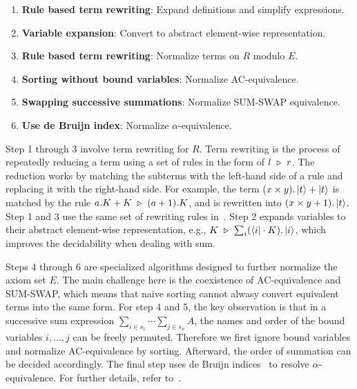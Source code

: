 \begin{enumerate}
    \item \textbf{Rule based term rewriting}: Expand definitions and simplify expressions.
    \item \textbf{Variable expansion}: Convert to abstract element-wise representation.
    \item \textbf{Rule based term rewriting}: Normalize terms on \( R \) modulo \( E \).
    \item \textbf{Sorting without bound variables}: Normalize AC-equivalence.
    \item \textbf{Swapping successive summations}: Normalize SUM-SWAP equivalence.
    \item \textbf{Use de Bruijn index}: Normalize \( \alpha \)-equivalence.
\end{enumerate}

Step 1 through 3 involve term rewriting for $R$. 
Term rewriting is the process of repeatedly reducing a term using a set of rules in the form of $l\ \reduce\ r$. The reduction works by matching the subterms with the left-hand side of a rule and replacing it with the right-hand side. 
For example, the term $(x\times y) . \ket{t} + \ket{t}$ is matched by the rule $a.K + K\ \triangleright\ (a + 1).K$, and is rewritten into $(x\times y + 1) . \ket{t}$.
Step 1 and 3 use the same set of rewriting rules in~.
Step 2 expands variables to their abstract element-wise representation, e.g., $K \ \triangleright\ \sum_{i} (\bra{i} \cdot K). \ket{i}$, which improves the decidability when dealing with sum. 


Steps 4 through 6 are specialized algorithms designed to further normalize the axiom set $E$.
The main challenge here is the coexistence of AC-equivalence and SUM-SWAP, which means that naive sorting cannot alwasy convert equivalent terms into the same form.
For step 4 and 5, the key observation is that in a successive sum expression \( \sum_{i \in s_1} \cdots \sum_{j \in s_n} A \), the names and order of the bound variables \( i, \dots, j \) can be freely permuted. Therefore we first ignore bound variables and normalize AC-equivalence by sorting. Afterward, the order of summation can be decided accordingly. The final step uses de Bruijn indices~\cite{deBruijn1972lambda} to resolve $\alpha$-equivalence. For further details, refer to~.


